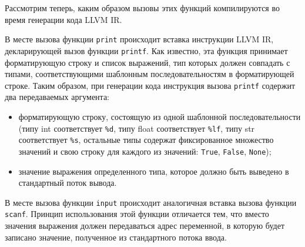 Рассмотрим теперь, каким образом вызовы этих функций компилируются во время генерации кода LLVM IR.

В месте вызова функции \verb|print| происходит вставка инструкции LLVM IR, декларирующей вызов функции \verb|printf|.
Как известно, эта функция принимает форматирующую строку и список выражений, тип которых должен совпадать с типами, соответствующими шаблонным последовательностям в форматирующей строке.
Таким образом, при генерации кода инструкция вызова \verb|printf| содержит два передаваемых аргумента:

\begin{itemize}
  \item форматирующую строку, состоящую из одной шаблонной последовательности (типу int соответствует \verb|%d|, типу float соответствует \verb|%lf|, типу str соответствует \verb|%s|, остальные типы содержат фиксированное множество значений и свою строку для каждого из значений: \verb|True|, \verb|False|, \verb|None|);
  \item значение выражения определенного типа, которое должно быть выведено в стандартный поток вывода.
\end{itemize}

В месте вызова функции \verb|input| происходит аналогичная вставка вызова функции \verb|scanf|.
Принцип использования этой функции отличается тем, что вместо значения выражения должен передаваться адрес переменной, в которую будет записано значение, полученное из стандартного потока ввода.
